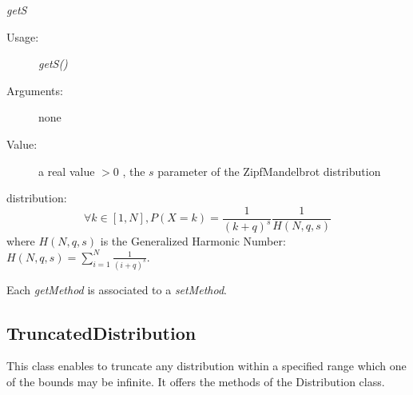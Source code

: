 \begin{description}
\begin{description}
\item \textit{getS}
\begin{description}
\item[Usage:] \textit{getS()}
\item[Arguments:] none
\item[Value:]  a real value $>0$ ,  the $s$ parameter of the ZipfMandelbrot distribution
\end{description}

\end{description}

\item[Details:]  \rule{0pt}{1em}
\begin{description}
\item distribution:
\begin{equation}
\forall k\in [1,N], P(X=k) = \frac{1}{(k+q)^s} \frac{1}{H(N,q,s)}
\end{equation}
where $H(N,q,s)$ is the Generalized Harmonic Number: $H(N,q,s) = \sum_{i=1}^{N} \displaystyle \frac{1}{(i+q)^s}$.

\end{description}
\bigskip

\item[Links:]  \rule{0pt}{1em}
\end{description}


Each  \textit{getMethod}  is associated to a \textit{setMethod}.





\newpage
\subsection{TruncatedDistribution}



This class enables to truncate any distribution within a specified range which one of the bounds may be infinite. It offers the methods of the Distribution class.

